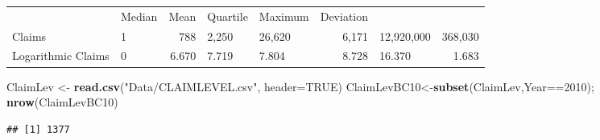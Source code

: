 \documentclass[]{book}
\newenvironment{Shaded}{\begin{snugshade}}{\end{snugshade}}
\newcommand{\KeywordTok}[1]{\textcolor[rgb]{0.13,0.29,0.53}{\textbf{{#1}}}}
\newcommand{\DataTypeTok}[1]{\textcolor[rgb]{0.13,0.29,0.53}{{#1}}}
\newcommand{\DecValTok}[1]{\textcolor[rgb]{0.00,0.00,0.81}{{#1}}}
\newcommand{\StringTok}[1]{\textcolor[rgb]{0.31,0.60,0.02}{{#1}}}
\newcommand{\OtherTok}[1]{\textcolor[rgb]{0.56,0.35,0.01}{{#1}}}
\newcommand{\NormalTok}[1]{{#1}}
\theoremstyle{definition}
\theoremstyle{definition}
\theoremstyle{definition}
\theoremstyle{remark}
\begin{document}
\begin{longtable}[]{@{}llrllrlr@{}}
\begin{minipage}[t]{0.12\columnwidth}
\end{minipage} & \begin{minipage}[t]{0.12\columnwidth}\raggedright\strut
Median\strut
\end{minipage} & \begin{minipage}[t]{0.12\columnwidth}\raggedright\strut
Mean\strut
\end{minipage} & \begin{minipage}[t]{0.12\columnwidth}\raggedleft\strut
Quartile\strut
\end{minipage} & \begin{minipage}[t]{0.12\columnwidth}\raggedright\strut
Maximum\strut
\end{minipage} & \begin{minipage}[t]{0.12\columnwidth}\raggedleft\strut
Deviation\strut
\end{minipage}\tabularnewline
Claims & 1 & 788 & 2,250 & 26,620 & 6,171 & 12,920,000 &
368,030\tabularnewline
Logarithmic Claims & 0 & 6.670 & 7.719 & 7.804 & 8.728 & 16.370 &
1.683\tabularnewline
\bottomrule
\end{longtable}

\begin{Shaded}
\begin{Highlighting}[]
\NormalTok{ClaimLev <-}\StringTok{ }\KeywordTok{read.csv}\NormalTok{(}\StringTok{"Data/CLAIMLEVEL.csv"}\NormalTok{, }\DataTypeTok{header=}\OtherTok{TRUE}\NormalTok{)}
\NormalTok{ClaimLevBC10<-}\KeywordTok{subset}\NormalTok{(ClaimLev,Year==}\DecValTok{2010}\NormalTok{); }\KeywordTok{nrow}\NormalTok{(ClaimLevBC10)}
\end{Highlighting}
\end{Shaded}

\begin{verbatim}
## [1] 1377
\end{verbatim}

\begin{Shaded}
\end{Shaded}
\end{document}
